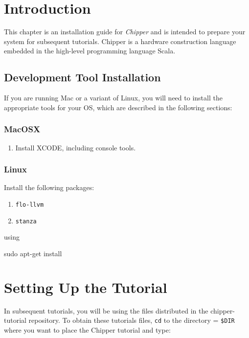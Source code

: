 \section{Introduction}

This chapter is an installation guide for {\em Chipper} and is intended to prepare your system for subsequent tutorials.  Chipper is a hardware
construction language embedded in the high-level programming language
Scala.

\subsection{Development Tool Installation}

If you are running Mac or a variant of Linux, you will need to install the appropriate tools for your OS, which are described in the following sections:

\subsubsection{MacOSX}

\begin{enumerate}
\item Install XCODE, including console tools.
\end{enumerate}

\subsubsection{Linux}

Install the following packages:

\begin{enumerate}
\item \verb|flo-llvm|
\item \verb+stanza+
\end{enumerate}

\noindent
using

\begin{bash}
sudo apt-get install
\end{bash}


\section{Setting Up the Tutorial}

In subsequent tutorials, you will be using the files distributed in the chipper-tutorial repository. To obtain these tutorials files, \verb+cd+ to the directory = \verb+$DIR+ where you want to place the Chipper tutorial and type:

